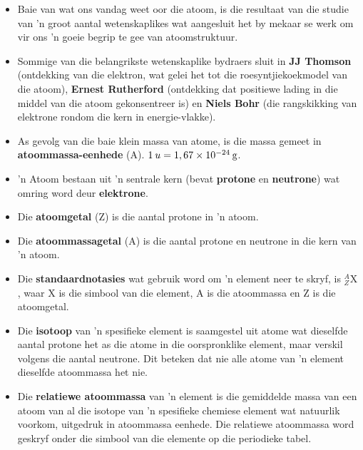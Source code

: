     \label{m38741*cid10}
\nopagebreak
\begin{itemize}[noitemsep]
\item Baie van wat ons vandag weet oor die atoom, is die resultaat van die studie van 'n groot aantal wetenskaplikes wat aangesluit het by mekaar se werk om vir ons 'n goeie begrip te gee van atoomstruktuur.
\item Sommige van die belangrikste wetenskaplike bydraers sluit in \textbf{JJ Thomson} (ontdekking van die elektron, wat gelei het tot die roesyntjiekoekmodel van die atoom), \textbf{Ernest Rutherford} (ontdekking dat positiewe lading in die middel van die atoom gekonsentreer is) en \textbf{Niels Bohr} (die rangskikking van elektrone rondom die kern in energie-vlakke).
\item As gevolg van die baie klein massa van atome, is die massa gemeet in \textbf{atoommassa-eenhede} (A). $1\phantom{\rule{2pt}{0ex}}u=1,67\ensuremath{\times}10{}^{-24}\phantom{\rule{2pt}{0ex}}\text{g}$.
\item 'n Atoom bestaan uit 'n sentrale kern (bevat \textbf{protone} en \textbf{neutrone}) wat omring word deur \textbf{elektrone}.
\item Die \textbf{atoomgetal} (Z) is die aantal protone in 'n atoom.
\item Die \textbf{atoommassagetal} (A) is die aantal protone en neutrone in die kern van 'n atoom.
\item Die \textbf{standaardnotasies} wat gebruik word om 'n element neer te skryf, is $_{Z}^{A}\text{X}$, waar X is die simbool van die element, A is die atoommassa en Z is die atoomgetal.
\item Die \textbf{isotoop} van 'n spesifieke element is saamgestel uit atome wat dieselfde aantal protone het as die atome in die oorspronklike element, maar verskil volgens die aantal neutrone. Dit beteken dat nie alle atome van 'n element dieselfde atoommassa het nie.
\item Die \textbf{relatiewe atoommassa} van 'n element is die gemiddelde massa van een atoom van al die isotope van 'n spesifieke chemiese element wat natuurlik voorkom, uitgedruk in atoommassa eenhede. Die relatiewe atoommassa word geskryf onder die simbool van die elemente op die periodieke tabel.

\end{itemize}
